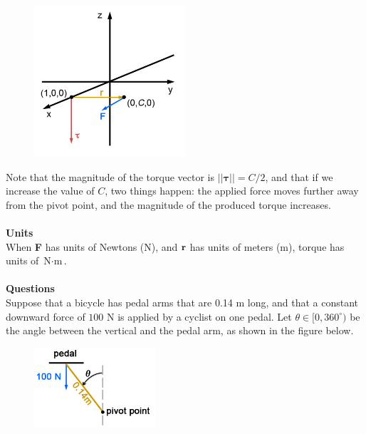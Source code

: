 \documentclass{article}
\begin{document}
\begin{enumerate}
\begin{figure}[!htbp]
\begin{center}
    \includegraphics[width=0.5\textwidth]{WA01TorqueExample.jpg}
  \end{center}
\end{figure}

Note that the magnitude of the torque vector is $||\boldsymbol\tau|| = C/2$, and that if we increase the value of $C$, two things happen: the applied force moves further away from the pivot point, and the magnitude of the produced torque increases. \\\\
\textbf{Units}\\
When \textbf{F} has units of Newtons (N), and $\mathbf{r}$ has units of meters (m), torque has units of $\text{N}\cdot\text{m}$.\\\\
\textbf{Questions}\\
Suppose that a bicycle has pedal arms that are 0.14 m long, and that a constant downward force of $100 \text{ N}$ is applied by a cyclist on one pedal.  Let $\theta \in [0,360^{\circ})$ be the angle between the vertical and the pedal arm, as shown in the figure below. 
\begin{figure}[!htbp]
  \begin{center}
    \includegraphics[width=0.4\textwidth]{WA01Bicycle.jpg}

\end{center}
\end{figure}
\end{enumerate}
\end{document}
